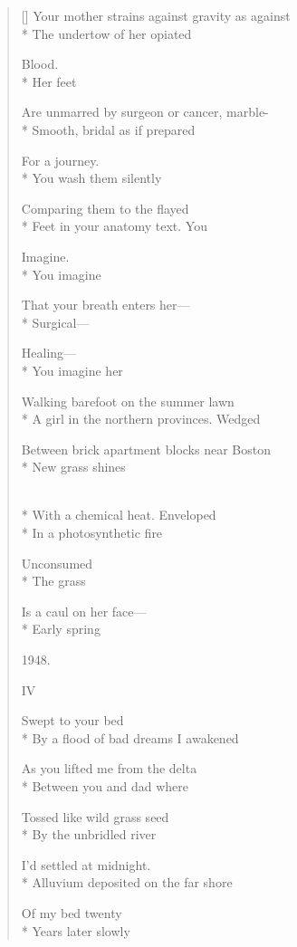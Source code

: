 \begin{verse}[\versewidth]
Your mother strains against gravity as against\\*
The undertow of her opiated

Blood.\\*
Her feet

Are unmarred by surgeon or cancer, marble-\\*
Smooth, bridal \qquad as if prepared

For a journey.\\*
You wash them \qquad silently

Comparing them to the flayed\\*
Feet in your anatomy text. \qquad  You

Imagine.\\*
You imagine

That your breath enters her---\\*
Surgical---

Healing---\\*
You imagine her

Walking barefoot on the summer lawn\\*
A girl in the northern provinces. \qquad Wedged

Between brick apartment blocks near Boston\\*
New grass shines

\\*
With a chemical heat.  Enveloped\\*
In a photosynthetic fire

Unconsumed\\*
The grass

Is a caul on her face---\\*
Early spring

1948.

 \qquad  \qquad  \qquad IV

 \qquad  \qquad Swept to your bed\\*
By a flood of bad dreams   I awakened

As you lifted me from the delta\\*
Between you and dad \qquad  \qquad where

Tossed like wild grass seed\\*
By the unbridled river

I'd settled at midnight.\\*
Alluvium deposited on the far shore

Of my bed twenty\\*
Years later slowly


\end{verse}
